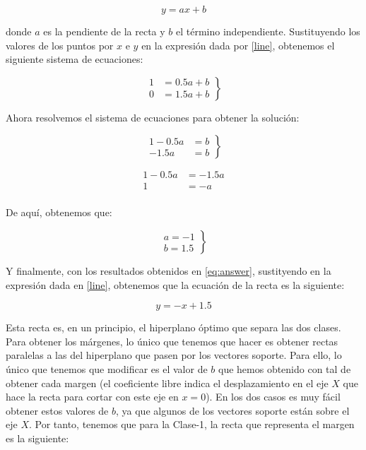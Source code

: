 \documentclass[11pt,a4paper]{article}
\begin{document}
\begin{equation}
\label{line}
y = ax + b
\end{equation}

\noindent donde $a$ es la pendiente de la recta y $b$ el término independiente. Sustituyendo los valores de los puntos por $x$ e $y$
en la expresión dada por \eqref{line}, obtenemos el siguiente sistema de ecuaciones:

\begin{equation}
\left.
\begin{aligned}
	1 &= 0.5a + b \\
	0 &= 1.5a + b
\end{aligned}
\right\rbrace
\end{equation}

Ahora resolvemos el sistema de ecuaciones para obtener la solución:

\begin{equation}
\left.
\begin{aligned}
	1 - 0.5a &= b \\
	-1.5a&= b
\end{aligned}
\right\rbrace
\end{equation}

\begin{equation}
\begin{aligned}
1 - 0.5a &= -1.5a \\
1 &= -a \\
\end{aligned}
\end{equation}

De aquí, obtenemos que:

\begin{equation}
\label{eq:answer}
\left.
\begin{aligned}
a = -1 \\
b = 1.5
\end{aligned}
\right\rbrace
\end{equation}

Y finalmente, con los resultados obtenidos en \eqref{eq:answer}, sustityendo en la expresión dada en \eqref{line}, obtenemos que la
ecuación de la recta es la siguiente:

\begin{equation}
y = -x + 1.5
\end{equation}

Esta recta es, en un principio, el hiperplano óptimo que separa las dos clases. Para obtener los márgenes, lo único que tenemos que
hacer es obtener rectas paralelas a las del hiperplano que pasen por los vectores soporte. Para ello, lo único que tenemos que
modificar es el valor de $b$ que hemos obtenido con tal de obtener cada margen (el coeficiente libre indica el desplazamiento
en el eje $X$ que hace la recta para cortar con este eje en $x = 0$). En los dos casos es muy fácil obtener estos valores de $b$,
ya que algunos de los vectores soporte están sobre el eje $X$. Por tanto, tenemos que para la Clase-1, la recta que representa el
margen es la siguiente:
\end{document}

